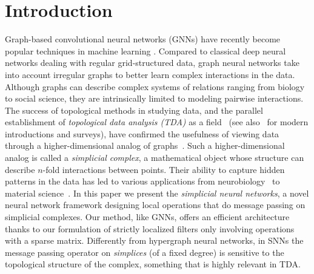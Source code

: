 \section{Introduction}



Graph-based convolutional neural networks (GNNs) have recently become popular techniques in machine learning . Compared to classical deep neural networks dealing with regular grid-structured data, graph neural networks take into account irregular graphs to better learn complex interactions in the data. Although graphs can describe complex systems of relations ranging from biology to social science, they are intrinsically limited to modeling pairwise interactions. 
The success of topological methods in studying data, and the parallel establishment of \emph{topological data analysis (TDA)} as a field~\cite{edelsbrunner2000topological, zomorodian2005computing} (see also~\cite{carlsson2008,chazal2017,edelsbrunner2010computational,ghrist2008barcodes} for modern introductions and surveys), have confirmed the usefulness of viewing data through a higher-dimensional analog of graphs~\cite{moore2012,patania2017}. Such a higher-dimensional analog is called a \emph{simplicial complex}, a mathematical object whose structure can  describe $n$-fold interactions between points. Their ability to capture hidden patterns in the data has led to various applications from neurobiology~\cite{giusti2015,reimann2017} to material science~\cite{hiraoka2016}.
In this paper we present the \textit{simplicial neural networks}, a novel neural network framework designing local operations that do message passing on simplicial complexes.
Our method, like GNNs, offers an efficient architecture thanks to our formulation of strictly localized filters only involving operations with a sparse matrix. 
Differently from hypergraph neural networks, in SNNs the message passing operator on \emph{simplices} (of a fixed degree) is sensitive to the topological structure of the complex, something that is highly relevant in TDA. 





















